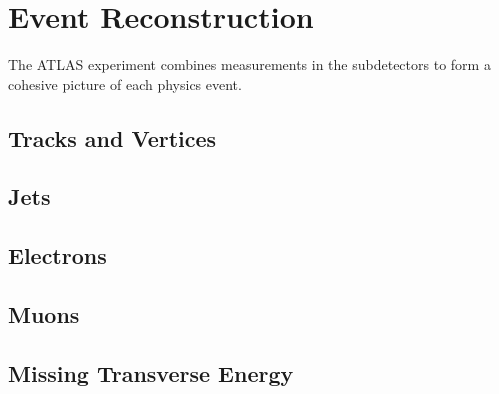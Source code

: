 \chapter{Event Reconstruction}

\label{ch:reconstruction}

The ATLAS experiment combines measurements in the subdetectors to form a cohesive picture of each physics event. 


\section{Tracks and Vertices}


\section{Jets}


\section{Electrons}


\section{Muons}


\section{Missing Transverse Energy}

